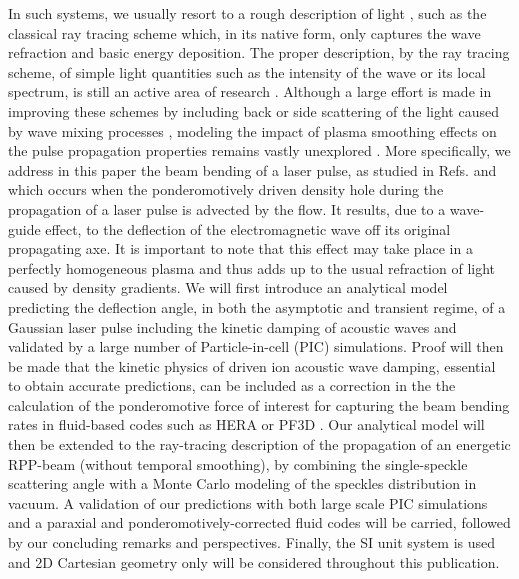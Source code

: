 \documentclass[%
 reprint,
 amsmath,amssymb,
 aps,
]{revtex4-1}
\begin{document}
In such systems, we usually resort to a rough description of light \cite[]{POP_Zhang_2014,Lefebvre_2018},  such as the classical ray tracing scheme which, in its native form, only captures the wave refraction and basic energy deposition.
The proper description, by the ray tracing scheme,  of simple  light quantities  such as the intensity  of the wave or its local spectrum, is still an active area of research  \cite{Egorchenkov_2001, Colaitis_2014, Strozzi_2017}.
Although a large effort is made in improving these schemes by including back or side scattering of the light caused by wave mixing processes \cite[]{Strozzi_2017,POP_Debayle_2019},  
modeling the impact of plasma smoothing effects on the pulse propagation properties remains vastly unexplored \cite[]{POF_Anderson,POP_Still_2000,POP_Grech_2006,PRL_Grech_2009}.
More specifically, we address in this paper the beam bending  of  a laser pulse, as studied in Refs. \cite{PRL_Hinkel_1996,POP_Rose_96,Vu_1997,POP_Rose_97,PRL_Montgomery} and which occurs when the ponderomotively driven density hole  during the propagation of a laser pulse is advected by the flow. It results,  due to a wave-guide effect, to the deflection of the electromagnetic wave off its original propagating axe. It is important to note that  this effect may take place in a perfectly homogeneous plasma and thus adds up to the usual refraction of light caused by density gradients. 
We will first introduce an analytical model predicting the deflection angle, in both the asymptotic and transient regime, of a Gaussian laser pulse including the kinetic damping of acoustic waves and validated by  a large number of  Particle-in-cell (PIC) simulations. 
Proof will then be made that the kinetic  physics of  driven ion acoustic wave damping, essential to obtain accurate predictions, can be   included as a correction in the 
 the calculation of the ponderomotive force of interest for capturing the beam bending rates in fluid-based codes such as HERA or PF3D  \cite{Berger_1995,Still_2006,Loiseau_2006, Huller_2006}. 
Our analytical  model  will then be extended to
the ray-tracing description of the propagation of an energetic RPP-beam (without temporal smoothing), by
combining the single-speckle scattering angle with a Monte Carlo modeling of the speckles distribution in vacuum. 
A validation of our  predictions with both large scale PIC simulations and a paraxial and ponderomotively-corrected fluid codes will be carried,
followed by our concluding remarks and perspectives. Finally, the SI unit system is used and 2D Cartesian geometry only will be considered throughout this publication. 
\end{document}
